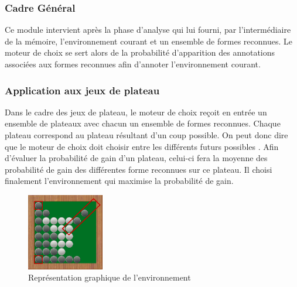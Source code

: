 

\subsubsection{Cadre Général}

Ce module intervient après la phase d'analyse qui lui fourni, par l'intermédiaire de la mémoire, l'environnement courant et un ensemble de formes reconnues. Le \og moteur de choix \fg{} se sert alors de la probabilité d'apparition des annotations associées aux formes reconnues afin d'annoter l'environnement courant.

\subsubsection{Application aux jeux de plateau}

Dans le cadre des jeux de plateau, le moteur de choix reçoit en entrée un ensemble de plateaux avec chacun un ensemble de formes reconnues. Chaque plateau correspond au plateau résultant d'un coup possible. On peut donc dire que le moteur de choix doit choisir entre les différents \og futurs possibles \fg{}. Afin d'évaluer la probabilité de gain d'un plateau, celui-ci fera la moyenne des probabilité de gain des différentes forme reconnues sur ce plateau. Il choisi finalement l'environnement qui maximise la probabilité de gain.

\begin{figure}[H] 
  \begin{center}
		\includegraphics[width=0.3\textwidth]{files/raisonneur/moteur_de_choix} 
	\end{center}
\caption{Représentation graphique de l'environnement} 
\label{img_env}
\end{figure}
